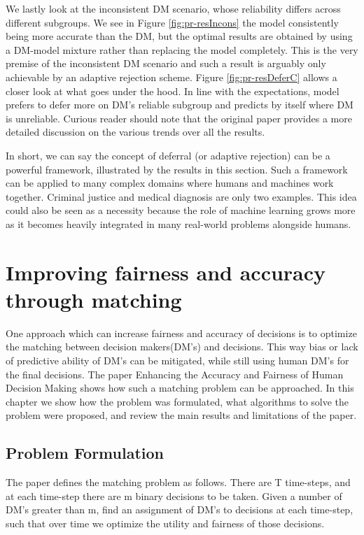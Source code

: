\documentclass[11pt,a4paper,final]{article}
\begin{document}
We lastly look at the inconsistent DM scenario, whose reliability differs across different subgroups. We see in Figure \ref{fig:pr-resIncons} the model consistently being more accurate than the DM, but the optimal results are obtained by using a DM-model mixture rather than replacing the model completely. This is the very premise of the inconsistent DM scenario and such a result is arguably only achievable by an adaptive rejection scheme. Figure \ref{fig:pr-resDeferC} allows a closer look at what goes under the hood. In line with the expectations, model prefers to defer more on DM's reliable subgroup and predicts by itself where DM is unreliable. Curious reader should note that the original paper provides a more detailed discussion on the various trends over all the results.

In short, we can say the concept of deferral (or adaptive rejection) can be a powerful framework, illustrated by the results in this section. Such a framework can be applied to many complex domains where humans and machines work together. Criminal justice and medical diagnosis are only two examples. This idea could also be seen as a necessity because the role of machine learning grows more as it becomes heavily integrated in many real-world problems alongside humans.

\section{Improving fairness and accuracy through matching}
\label{sec:paper3}

One approach which can increase fairness and accuracy of decisions is to optimize the matching between decision makers(DM's) and decisions. This way bias or lack of predictive ability of DM's can be mitigated, while still using human DM's for the final decisions. The paper Enhancing the Accuracy and Fairness of Human Decision Making \citep{2018arXiv180510318V} shows how such a matching problem can be approached. In this chapter we show how the problem was formulated, what algorithms to solve the problem were proposed, and review the main results and limitations of the paper.
  
\subsection{Problem Formulation}
The paper defines the matching problem as follows. There are T time-steps, and at each time-step there are m binary decisions to be taken. Given a number of DM's greater than m, find an assignment of DM's to decisions at each time-step, such that over time we optimize the utility and fairness of those decisions.
\end{document}
